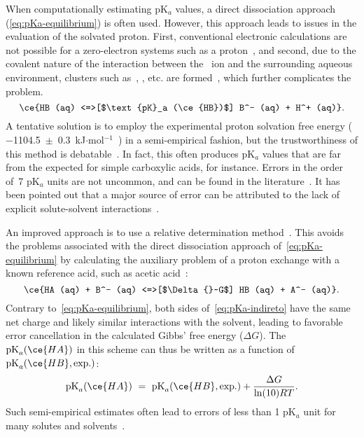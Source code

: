 When computationally estimating pK$_a$ values,
a direct dissociation approach (\cref{eq:pKa-equilibrium}) is often used.
However,
this approach leads to issues in the evaluation of the solvated proton.
First,
conventional electronic calculations are not possible for a zero-electron systems such as a proton~\cite{Ding_2009,Sumon_2012},
and second,
due to the covalent nature of the interaction between the~ ion and the surrounding aqueous environment,
clusters such as~,
,
etc.
are formed~\cite{Sumon_2012},
which further complicates the problem.
%
\begin{equation}
	\ce{HB (aq) <=>[$\text{pK}_a (\ce{HB})$] B^- (aq) + H^+ (aq)}\text{.}
	\label{eq:pKa-equilibrium}
\end{equation}
%
A tentative solution is to employ the experimental proton solvation free energy
\linebreak
($-$1104.5~$\pm$~0.3~kJ$\cdot$mol$^{-1}$~\cite{Tissandier_1998,Marenich_2009}) in a semi-empirical fashion,
but the trustworthiness of this method is debatable~\cite{Yang_2013}.
In fact,
this often produces pK$_a$ values that are far from the expected for simple carboxylic acids,
for instance.
Errors in the order of~7 pK$_a$ units are not uncommon,
and can be found in the literature~\cite{Pliego_2002,Ding_2009}.
It has been pointed out that a major source of error can be attributed to the lack of explicit solute-solvent interactions~\cite{Pliego_2002}.

An improved approach is to use a relative determination method~\cite{Ding_2009}.
This avoids the problems associated with the direct dissociation approach of~\cref{eq:pKa-equilibrium} by calculating the auxiliary problem of a proton exchange with a known reference
acid,
such as acetic acid~\cite{Goldberg_2002}:
%
\begin{equation}
	\ce{HA (aq) + B^- (aq) <=>[$\Delta{}~G$] HB (aq) + A^- (aq)}\text{.}
	\label{eq:pKa-indireto}
\end{equation}
%
Contrary to~\cref{eq:pKa-equilibrium},
both sides of~\cref{eq:pKa-indireto} have the same net charge and likely similar interactions with the solvent,
leading to favorable error cancellation in the calculated Gibbs' free energy ($\Delta G$).
The~$\text{pK}_a(\ce{HA})$ in this scheme
can thus be written as a function of~$\text{pK}_a(\ce{HB},
	\text{exp.})$:
%
\begin{equation}
	\text{pK}_a(\ce{HA})~=~\text{pK}_a(\ce{HB},
	\text{exp.}) + \frac{\Delta G}{\ln(10) R T}\text{.}
\end{equation}
%
Such semi-empirical estimates often lead to errors of less than 1 pK$_a$
unit for many solutes and solvents~\cite{Ding_2009}.

